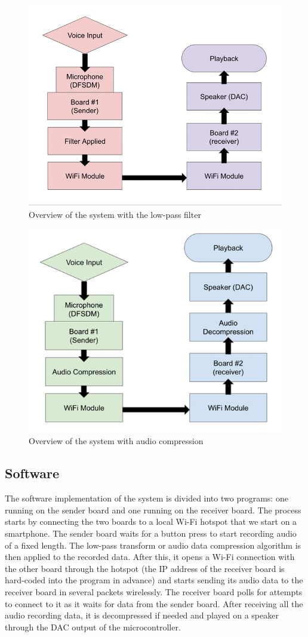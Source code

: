 \documentclass[journal]{IEEEtran}
\begin{document}
\begin{figure}[H]
    \centering
    \includegraphics[width=0.7\linewidth]{bibtex/Images/Filter.png}
    \caption{Overview of the system with the low-pass filter}
    \label{Filter}
\end{figure}

\begin{figure}[H]
    \centering
    \includegraphics[width=0.7\linewidth]{bibtex/Images/Compression.png}
    \caption{Overview of the system with audio compression}
    \label{Compression}
\end{figure}

\subsection{Software}
The software implementation of the system is divided into two programs: one running on the sender board and one running on the receiver board. The process starts by connecting the two boards to a local Wi-Fi hotspot that we start on a smartphone. The sender board waits for a button press to start recording audio of a fixed length. The low-pass transform or audio data compression algorithm is then applied to the recorded data. After this, it opens a Wi-Fi connection with the other board through the hotspot (the IP address of the receiver board is hard-coded into the program in advance) and starts sending its audio data to the receiver board in several packets wirelessly. The receiver board polls for attempts to connect to it as it waits for data from the sender board. After receiving all the audio recording data, it is decompressed if needed and played on a speaker through the DAC output of the microcontroller.
\end{document}
